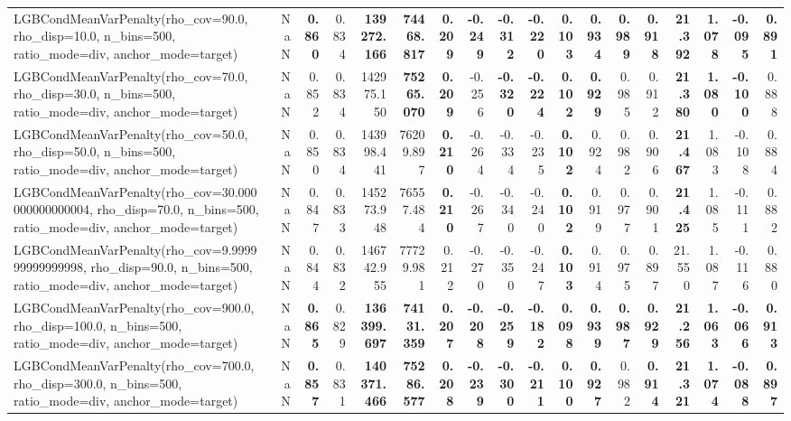 \documentclass[11pt]{article}
\theoremstyle{plain}
\theoremstyle{definition}
\newcommand{\1}{\mathbf{1}}
\begin{document}
\begin{table}[htbp]
{\begin{tabular}{lrrrrrrrrrrrrrrrrr}
LGBCondMeanVarPenalty(rho\_cov=90.0, rho\_disp=10.0, n\_bins=500, ratio\_mode=div, anchor\_mode=target) & NaN & \textbf{0.860} & 0.834 & \textbf{139272.166} & \textbf{74468.817} & \textbf{0.209} & \textbf{-0.249} & \textbf{-0.312} & \textbf{-0.220} & \textbf{0.103} & \textbf{0.934} & \textbf{0.989} & \textbf{0.918} & \textbf{21.392} & \textbf{1.078} & \textbf{-0.095} & \textbf{0.891} \\
LGBCondMeanVarPenalty(rho\_cov=70.0, rho\_disp=30.0, n\_bins=500, ratio\_mode=div, anchor\_mode=target) & NaN & 0.852 & 0.834 & 142975.150 & \textbf{75265.070} & \textbf{0.209} & -0.256 & \textbf{-0.320} & \textbf{-0.224} & \textbf{0.102} & \textbf{0.929} & 0.985 & 0.912 & \textbf{21.380} & \textbf{1.080} & \textbf{-0.100} & 0.888 \\
LGBCondMeanVarPenalty(rho\_cov=50.0, rho\_disp=50.0, n\_bins=500, ratio\_mode=div, anchor\_mode=target) & NaN & 0.850 & 0.834 & 143998.441 & 76209.897 & \textbf{0.210} & -0.264 & -0.334 & -0.235 & \textbf{0.102} & 0.924 & 0.982 & 0.906 & \textbf{21.467} & 1.083 & -0.108 & 0.884 \\
LGBCondMeanVarPenalty(rho\_cov=30.000000000000004, rho\_disp=70.0, n\_bins=500, ratio\_mode=div, anchor\_mode=target) & NaN & 0.847 & 0.833 & 145273.948 & 76557.484 & \textbf{0.210} & -0.267 & -0.340 & -0.240 & \textbf{0.102} & 0.919 & 0.977 & 0.901 & \textbf{21.425} & 1.085 & -0.111 & 0.882 \\
LGBCondMeanVarPenalty(rho\_cov=9.999999999999998, rho\_disp=90.0, n\_bins=500, ratio\_mode=div, anchor\_mode=target) & NaN & 0.844 & 0.832 & 146742.955 & 77729.981 & 0.212 & -0.270 & -0.350 & -0.247 & \textbf{0.103} & 0.914 & 0.975 & 0.897 & 21.550 & 1.087 & -0.116 & 0.880 \\
LGBCondMeanVarPenalty(rho\_cov=900.0, rho\_disp=100.0, n\_bins=500, ratio\_mode=div, anchor\_mode=target) & NaN & \textbf{0.865} & 0.829 & \textbf{136399.697} & \textbf{74131.359} & \textbf{0.207} & \textbf{-0.208} & \textbf{-0.259} & \textbf{-0.182} & \textbf{0.098} & \textbf{0.939} & \textbf{0.987} & \textbf{0.929} & \textbf{21.256} & \textbf{1.063} & \textbf{-0.066} & \textbf{0.913} \\
LGBCondMeanVarPenalty(rho\_cov=700.0, rho\_disp=300.0, n\_bins=500, ratio\_mode=div, anchor\_mode=target) & NaN & \textbf{0.857} & 0.831 & \textbf{140371.466} & \textbf{75286.577} & \textbf{0.208} & \textbf{-0.239} & \textbf{-0.300} & \textbf{-0.211} & \textbf{0.100} & \textbf{0.927} & 0.982 & \textbf{0.914} & \textbf{21.321} & \textbf{1.074} & \textbf{-0.088} & \textbf{0.897} \\

\end{tabular}}
\end{table}
\end{document}
